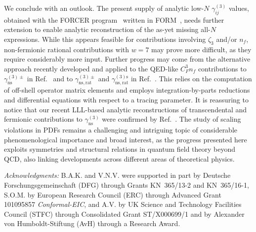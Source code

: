 \documentclass[
 twocolumn,
 superscriptaddress,
 preprintnumbers,
 nofootinbib,
 amsmath,amssymb,
 aps,
 prl
 ]{revtex4-2}
\begin{document}
We conclude with an outlook.
The present supply of analytic low-$N$ $\gamma_{ij}^{(3)}$ values, obtained with the FORCER program~\cite{Ruijl:2017cxj} written in FORM~\cite{Vermaseren:2000nd,Kuipers:2012rf,Ruijl:2017dtg}, needs further extension to enable analytic reconstruction of the as-yet missing all-$N$ expressions.
While this appears feasible for contributions involving $\zeta_3$ and/or $n_f$, non-fermionic rational contributions with $w=7$ may prove more difficult, as they require considerably more input.
Further progress may come from the alternative approach recently developed and applied to the QED-like $C_F^3n_f$ contributions to $\gamma_{\mathrm{ns}}^{(3)\pm}$ in Ref.~\cite{Gehrmann:2023iah} and to $\gamma_{\mathrm{ns},\mathrm{rat}}^{(3)\pm}$ and
$\gamma_{\mathrm{ns},\mathrm{rat}}^{(3)\mathrm{s}}$ in Ref.~\cite{Gehrmann:2026qbl}.
This relies on the computation of off-shell operator matrix elements and employs integration-by-parts reductions and differential equations with respect to a tracing parameter.
It is reassuring to notice that our recent LLL-based \cite{Lenstra82factoringpolynomials,fplll} analytic reconstructions of transcendental \cite{Kniehl:2025jfs,Kniehl:2026axe} and fermionic \cite{Kniehl:2025ttz} contributions to $\gamma_{\mathrm{ns}}^{(3)}$ were confirmed by Ref.~\cite{Gehrmann:2026qbl}.
The study of scaling violations in PDFs remains a challenging and intriguing topic of considerable phenomenological importance and broad interest, as the progress presented here exploits symmetries and structural relations in quantum field theory beyond QCD, also linking developments across different areas of theoretical physics.

\vspace{2mm}
\begin{acknowledgments}
\emph{Acknowledgments:}
B.A.K. and V.N.V. were supported in part by Deutsche Forschungsgemeinschaft (DFG) through Grants KN~365/13-2 and KN~365/16-1, S.O.M. by European Research Council (ERC) through Advanced Grant 101095857 {\it Conformal-EIC}, and A.V. by UK Science and Technology Facilities Council (STFC) through Consolidated Grant ST/X000699/1 and by Alexander von Humboldt-Stiftung (AvH) through a Research Award.
\end{acknowledgments}
\end{document}
